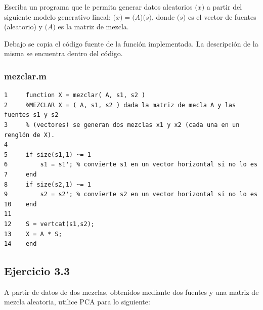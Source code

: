 \documentclass[11pt,a4paper,final]{article}
\begin{document}
Escriba un programa que le permita generar datos aleatorios $\mathbf(x)$ a partir del siguiente modelo generativo lineal: $\mathbf(x) = \mathbf(A) \mathbf(s)$, donde $\mathbf(s)$ es el vector de fuentes (aleatorio) y $\mathbf(A)$ es la matriz de mezcla.

Debajo se copia el código fuente de la función implementada. La descripción de la misma se encuentra dentro del código.

\subsubsection*{mezclar.m}
\begin{verbatim}
1     function X = mezclar( A, s1, s2 )
2     %MEZCLAR X = ( A, s1, s2 ) dada la matriz de mecla A y las fuentes s1 y s2 
3     % (vectores) se generan dos mezclas x1 y x2 (cada una en un renglón de X).
4     
5     if size(s1,1) ~= 1
6         s1 = s1'; % convierte s1 en un vector horizontal si no lo es
7     end
8     if size(s2,1) ~= 1
9         s2 = s2'; % convierte s2 en un vector horizontal si no lo es
10    end
11    
12    S = vertcat(s1,s2);
13    X = A * S;
14    end
\end{verbatim}
    

\subsection{Ejercicio 3.3}

A partir de datos de dos mezclas, obtenidos mediante dos fuentes y una matriz de mezcla aleatoria, utilice PCA para lo siguiente:
\end{document}
